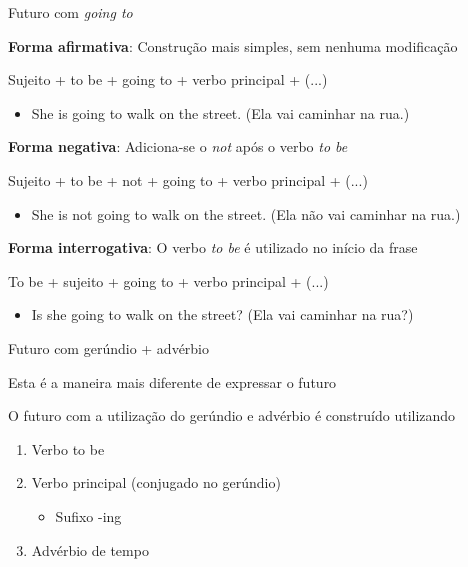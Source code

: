 \documentclass[compress,mathserif,xcolor=table]{beamer}
\begin{document}

\begin{frame}{Futuro com \textit{going to}}

\textbf{Forma afirmativa}: Construção mais simples, sem nenhuma modificação

Sujeito + to be + going to + verbo principal + (...)
\begin{itemize}
    \item She is going to walk on the street. (Ela vai caminhar na rua.)
\end{itemize}

\vspace{0.25cm}

\textbf{Forma negativa}: Adiciona-se o \textit{not} após o verbo \textit{to be}

Sujeito + to be + not + going to + verbo principal + (...)
\begin{itemize}
    \item She is not going to walk on the street. (Ela não vai caminhar na rua.)
\end{itemize}

\vspace{0.25cm}

\textbf{Forma interrogativa}: O verbo \textit{to be} é utilizado no início da frase

To be + sujeito + going to + verbo principal + (...)
\begin{itemize}
    \item Is she going to walk on the street? (Ela vai caminhar na rua?)
\end{itemize}

\end{frame}












\begin{frame}{Futuro com gerúndio + advérbio}

Esta é a maneira mais diferente de expressar o futuro

\vspace{0.5cm}

O futuro com a utilização do gerúndio e advérbio é construído utilizando
\begin{enumerate}
    \item Verbo to be
    \item Verbo principal (conjugado no gerúndio)
    \begin{itemize}
        \item Sufixo -ing
    \end{itemize}
    \item Advérbio de tempo
\end{enumerate}

\end{frame}
\end{document}
